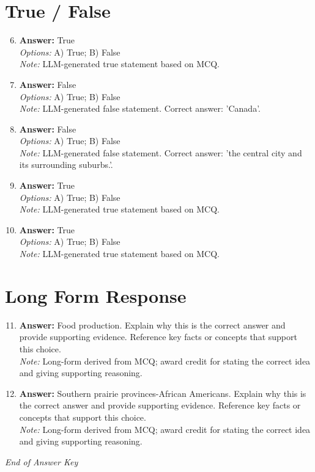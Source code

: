 \documentclass[12pt]{article}
\begin{document}
\section*{True / False}
\begin{enumerate}[label=\arabic*.]
\setcounter{enumi}{5}
\item \textbf{Answer:} True
\\ \textit{Options:} A) True; B) False
\\ \textit{Note:} LLM-generated true statement based on MCQ.
\item \textbf{Answer:} False
\\ \textit{Options:} A) True; B) False
\\ \textit{Note:} LLM-generated false statement. Correct answer: 'Canada'.
\item \textbf{Answer:} False
\\ \textit{Options:} A) True; B) False
\\ \textit{Note:} LLM-generated false statement. Correct answer: 'the central city and its surrounding suburbs.'.
\item \textbf{Answer:} True
\\ \textit{Options:} A) True; B) False
\\ \textit{Note:} LLM-generated true statement based on MCQ.
\item \textbf{Answer:} True
\\ \textit{Options:} A) True; B) False
\\ \textit{Note:} LLM-generated true statement based on MCQ.
\end{enumerate}

\section*{Long Form Response}
\begin{enumerate}[label=\arabic*.]
\setcounter{enumi}{10}
\item \textbf{Answer:} Food production. Explain why this is the correct answer and provide supporting evidence. Reference key facts or concepts that support this choice.
\\ \textit{Note:} Long-form derived from MCQ; award credit for stating the correct idea and giving supporting reasoning.
\item \textbf{Answer:} Southern prairie provinces-African Americans. Explain why this is the correct answer and provide supporting evidence. Reference key facts or concepts that support this choice.
\\ \textit{Note:} Long-form derived from MCQ; award credit for stating the correct idea and giving supporting reasoning.
\end{enumerate}

\vfill
\noindent\textit{End of Answer Key}
\end{document}
